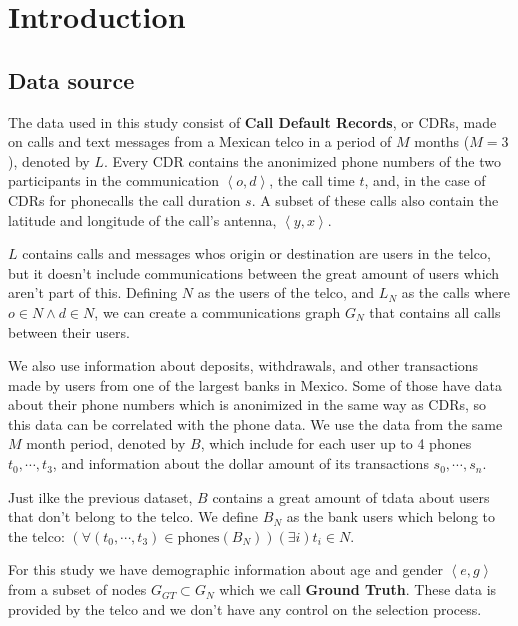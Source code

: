 \section{Introduction}

\subsection{Data source}

The data used in this study consist of \textbf{Call Default Records}, or CDRs, made on calls and text messages from a Mexican telco in a period of \( M \) months (\( M = 3 \)), denoted by \( L \). Every CDR contains the anonimized phone numbers of the two participants in the communication \(\left<o, d\right>\), the call time \( t \), and, in the case of CDRs for phonecalls the call duration \( s \). A subset of these calls also contain the latitude and longitude of the call's antenna, \( \left<y, x\right> \).

\( L \) contains calls and messages whos origin or destination are users in the telco, but it doesn't include communications between the great amount of users which aren't part of this. Defining \( N \) as the users of the telco, and \( L_N \) as the calls where \( o \in N \wedge d \in N \), we can create a communications graph \( G_N \) that contains all calls between their users.

We also use information about deposits, withdrawals, and other transactions made by users from one of the largest banks in Mexico. Some of those have data about their phone numbers which is anonimized in the same way as CDRs, so this data can be correlated with the phone data. We use the data from the same \( M \) month period, denoted by \( B \), which include for each user up to 4 phones \( t_0, \cdots, t_3 \), and information about the dollar amount of its transactions \( s_0, \cdots, s_n \).

Just ilke the previous dataset, \( B \) contains a great amount of tdata about users that don't belong to the telco. We define \( B_N \) as the bank users which belong to the telco: \( \left( \forall \left( t_0, \cdots, t_3 \right) \in \text{phones}\left( B_N \right) \right) \left( \exists i \right) t_i \in N \).

For this study we have demographic information about age and gender \( \left< e, g \right> \) from a subset of nodes \( G_{GT} \subset G_N \) which we call \textbf{Ground Truth}. These data is provided by the telco and we don't have any control on the selection process.

